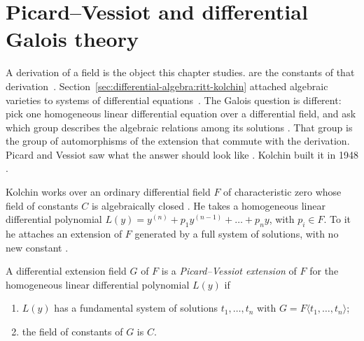 \section{Picard--Vessiot and differential Galois theory}\label{sec:differential-algebra:differential-galois}

A derivation of a field is the object this chapter studies. %
are the constants of that derivation~\cite[pp.~1--6]{Kolchin1948PicardVessiot}. Section~\ref{sec:differential-algebra:ritt-kolchin}
attached algebraic
varieties to systems of differential equations~\cite[pp.~1--6]{Kolchin1948PicardVessiot}. The Galois question is
different: pick one homogeneous linear differential equation over a
differential field, and ask which group describes the algebraic relations
among its solutions \cite[pp.~1--6]{Kolchin1948PicardVessiot}. That group is
the group of automorphisms of the extension that commute with the
derivation. Picard and
Vessiot saw what the answer should look like
\cite[pp.~1--2]{Kolchin1948PicardVessiot}. Kolchin built it in 1948
\cite[pp.~1--6]{Kolchin1948PicardVessiot}.

Kolchin works over an ordinary differential field $F$ of characteristic
zero whose field of constants $C$ is algebraically closed
\cite[p.~29]{Kolchin1948PicardVessiot}. He takes a homogeneous linear
differential polynomial $L(y) = y^{(n)} + p_1 y^{(n-1)} + \dots + p_n y$,
with $p_i\in F$. To it he attaches an extension of $F$ generated by a full
system of solutions, with no new constant
\cite[p.~29]{Kolchin1948PicardVessiot}.

\begin{definition}\label{def:diffalg:pv-extension}
A differential extension field $G$ of $F$ is a \emph{Picard--Vessiot
extension} of $F$ for the homogeneous linear differential polynomial
$L(y)$ if
\begin{enumerate}
\item $L(y)$ has a fundamental system of solutions $t_1, \dots, t_n$ with
  $G = F\langle t_1, \dots, t_n\rangle$;
\item the field of constants of $G$ is $C$.
\end{enumerate}
\end{definition}

